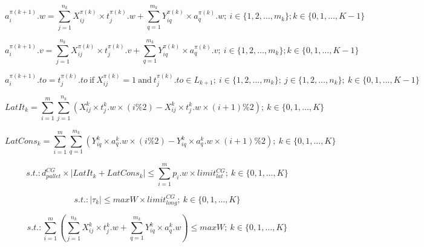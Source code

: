 \documentclass[preprint,authoryear]{elsarticle}
\begin{document}
\begin{equation} \label{eq:cons2}
	a_i^{\pi(k+1)}.w = \sum_{j=1}^{n_k} X_{ij}^{\pi(k)} \times t_j^{\pi(k)}.w + \sum_{q=1}^{m_k} Y_{iq}^{\pi(k)} \times a_q^{\pi(k)}.w;  \ i \in \{1, 2, \ldots, m_k\}; k \in \{0, 1, \ldots, K-1\}
\end{equation}

\begin{equation} \label{eq:cons3}
	a_i^{\pi(k+1)}.v = \sum_{j=1}^{n_k} X_{ij}^{\pi(k)} \times t_j^{\pi(k)}.v + \sum_{q=1}^{m_k} Y_{iq}^{\pi(k)} \times a_q^{\pi(k)}.v;  \ i \in \{1, 2, \ldots, m_k\}; k \in \{0, 1, \ldots, K-1\}
\end{equation}

\begin{equation} \label{eq:cons5}
	a_i^{\pi(k+1)}.to = t^{\pi(k)}_j.to  \ \mbox{if} \ X^{\pi(k)}_{ij} = 1  \ \mbox{and} \ t^{\pi(k)}_j.to \in L_{k+1};  \ i \in \{1, 2, \ldots, m_k\}; \ j \in \{1, 2, \ldots, n_k\}; \ k \in \{0,1, \ldots, K-1\}
\end{equation}

\begin{equation} \label{eq:LatIt}
	LatIt_k = \sum_{i=1}^{m} \sum_{j=1}^{n_k} ( X_{ij}^k \times t_j^k.w \times (i\%2) - X_{ij}^k \times t_j^k.w \times (i+1)\%2 ); \ k \in \{0, 1, \ldots, K\}
\end{equation}

\begin{equation} \label{eq:LatCons}
	LatCons_k =  \sum_{i=1}^{m} \sum_{q=1}^{m_k}  ( Y_{iq}^k \times a_q^k.w \times (i\%2) - Y_{iq}^k \times a_q^k.w \times (i+1)\%2); \ k \in \{0, 1, \ldots, K\}
\end{equation}

\begin{equation} \label{eq:torqlat}
	s.t.: d^{CG}_{pallet} \times | LatIt_k + LatCons_k | \leq  \sum_{i=1}^{m}p_i.w \times limit^{CG}_{lat}; \ k \in \{0, 1, \ldots, K\}
\end{equation}

\begin{equation} \label{eq:torqlong}
	s.t.: |\tau_k| \leq maxW \times limit^{CG}_{long};\ k \in \{0, 1, \ldots, K\}
\end{equation}

\begin{equation} \label{eq:payload}
	s.t.: \sum_{i=1}^{m} (\sum_{j=1}^{n_k} X_{ij}^k \times t_j^k.w + \sum_{q=1}^{m_k} Y_{iq}^k \times a_q^k.w ) \leq maxW; \ k \in \{0, 1, \ldots, K\}
\end{equation}
\end{document}
